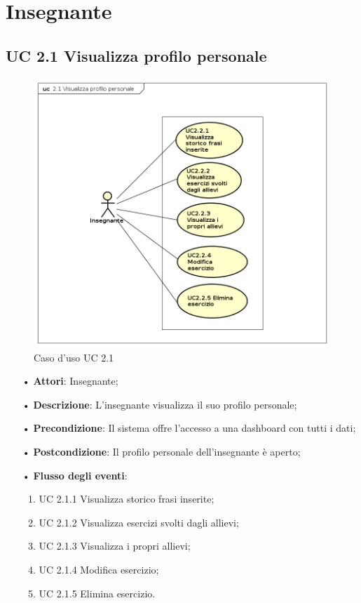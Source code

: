 
\section{Insegnante}
\subsection{UC 2.1 Visualizza profilo personale}

\begin{figure}[H]
\centering
\includegraphics[width=14cm]{img/UC21.png} 
\caption{Caso d'uso UC 2.1}
\end{figure}

\begin{itemize}
	\item[•] \textbf{Attori}: Insegnante;
	\item[•] \textbf{Descrizione}: L’insegnante visualizza il suo profilo personale;

	\item[•] \textbf{Precondizione}: Il sistema offre l’accesso a una dashboard con tutti i dati;

	\item[•] \textbf{Postcondizione}:  Il profilo personale dell’insegnante è aperto;
	\item[•] \textbf{Flusso degli eventi}:
		\begin{enumerate}
			\item UC 2.1.1 Visualizza storico frasi inserite;
			\item UC 2.1.2 Visualizza esercizi svolti dagli allievi;
			\item UC 2.1.3 Visualizza i propri allievi;
			\item UC 2.1.4 Modifica esercizio;
			\item UC 2.1.5 Elimina esercizio.
		\end{enumerate}
\end{itemize}


